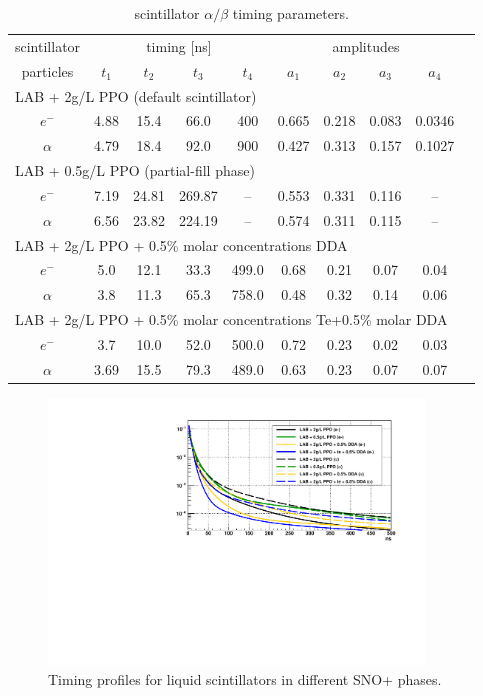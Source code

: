 \begin{table}[ht]
	\caption[]{scintillator $\alpha/\beta$ timing parameters\cite{tanner0p5,joshW1,chicagoTiming}.}	\label{scint_timing} 
	\centering
	\begin{tabular*}{165mm}{c@{\extracolsep{\fill}}*9c}
		\toprule 
		\multicolumn{1}{c}{scintillator} & \multicolumn{4}{c}{timing [ns]} & \multicolumn{4}{c}{amplitudes}\\
		\cline{0-1}\cline{2-5} \cline{6-9}		
		particles      & $t_1$ & $t_2$ & $t_3$ & $t_4$ & $a_1$ &$a_2$ &$a_3$&$a_4$\\
		\midrule
		\multicolumn{9}{l}{LAB + 2g/L PPO (default scintillator)}\\
		$e^-$ & 4.88 & 15.4 & 66.0 & 400 & 0.665 & 0.218 & 0.083& 0.0346\\	
		$\alpha$ & 4.79 & 18.4 & 92.0 & 900 & 0.427 & 0.313 & 0.157 & 0.1027\\
		\hline
		\multicolumn{9}{l}{LAB + 0.5g/L PPO (partial-fill phase)} \\
		$e^-$& 7.19 & 24.81 & 269.87 & -- &0.553 &0.331 &0.116 & --\\
		$\alpha$& 6.56 &23.82 &224.19&--& 0.574&0.311& 0.115&--\\
		\hline
		\multicolumn{9}{l}{LAB + 2g/L PPO + 0.5\% molar concentrations DDA} \\
		$e^-$ & 5.0& 12.1& 33.3& 499.0& 0.68& 0.21& 0.07& 0.04\\
		$\alpha$ &3.8 &11.3& 65.3& 758.0& 0.48& 0.32& 0.14& 0.06 \\
		\hline
		\multicolumn{9}{l}{LAB + 2g/L PPO + 0.5\% molar concentrations Te+0.5\% molar DDA}\\
		$e^-$ & 3.7 & 10.0 & 52.0  & 500.0 & 0.72 & 0.23 & 0.02 &0.03\\
		$\alpha$ & 3.69 & 15.5 & 79.3  & 489.0 & 0.63 & 0.23 & 0.07 &0.07\\	
		\bottomrule	
	\end{tabular*}
\end{table}

\begin{figure}[!htb]
	\centering
	\includegraphics[width=10cm]{plotAllTiming.pdf}
	\caption{Timing profiles for liquid scintillators in different SNO+ phases.}
	\label{allTiming}
\end{figure}

